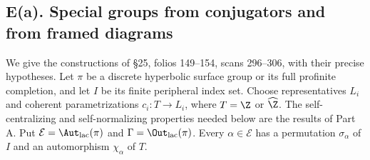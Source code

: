 \subsection{E(a). Special groups from conjugators and from framed diagrams}
\label{sec:ea}
We give the constructions of \S25, folios 149--154, scans 296--306,
with their precise hypotheses. Let $\pi$ be a discrete hyperbolic
surface group or its full profinite completion, and let $I$ be its finite
peripheral index set. Choose representatives $L_i$ and coherent
parametrizations $c_i:T\to L_i$, where $T=\Z$ or $\widehat\Z$.
The self-centralizing and self-normalizing properties needed below
are the results of Part A. Put
$\mathcal E=\Aut_{\rm lac}(\pi)$ and $\Gamma=\Out_{\rm lac}(\pi)$.
Every $\alpha\in\mathcal E$ has a permutation $\sigma_\alpha$ of $I$
and an automorphism $\chi_\alpha$ of $T$.

